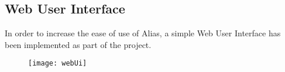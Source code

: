 \subsection{Web User Interface}
In order to increase the ease of use of Alias, a simple Web User Interface has been implemented as part of the project. 

\begin{figure}
	\texttt{[image: webUi]}
\end{figure}